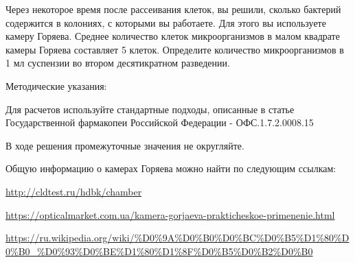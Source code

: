 
Через некоторое время после рассеивания клеток, вы решили, сколько бактерий содержится в колониях, с которыми вы работаете. Для этого вы используете камеру Горяева. Среднее количество клеток микроорганизмов в малом квадрате камеры Горяева составляет 5 клеток. Определите количество микроорганизмов в 1 мл суспензии во втором десятикратном разведении.

Методические указания: 

Для расчетов используйте стандартные подходы, описанные в статье Государственной фармакопеи Российской Федерации - ОФС.1.7.2.0008.15 

В ходе решения промежуточные значения не округляйте. 

Общую информацию о камерах Горяева можно найти по следующим ссылкам:

\noindent\url{http://cldtest.ru/hdbk/chamber}

\noindent\url{https://opticalmarket.com.ua/kamera-gorjaeva-prakticheskoe-primenenie.html}

\noindent\url{https://ru.wikipedia.org/wiki/%D0%9A%D0%B0%D0%BC%D0%B5%D1%80%D0%B0_%D0%93%D0%BE%D1%80%D1%8F%D0%B5%D0%B2%D0%B0}

